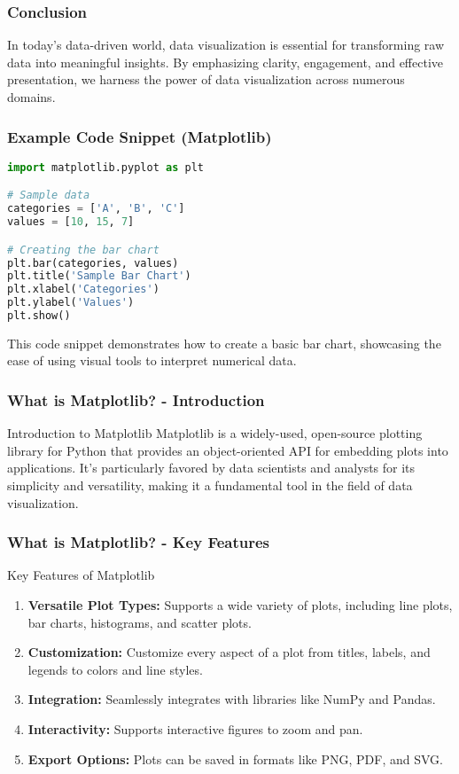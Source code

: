 \documentclass[aspectratio=169]{beamer}
\begin{document}
\begin{frame}[fragile]
    \frametitle{Conclusion}
    In today's data-driven world, data visualization is essential for transforming raw data into meaningful insights. By emphasizing clarity, engagement, and effective presentation, we harness the power of data visualization across numerous domains.
\end{frame}

\begin{frame}[fragile]
    \frametitle{Example Code Snippet (Matplotlib)}
    \begin{lstlisting}[language=Python]
import matplotlib.pyplot as plt

# Sample data
categories = ['A', 'B', 'C']
values = [10, 15, 7]

# Creating the bar chart
plt.bar(categories, values)
plt.title('Sample Bar Chart')
plt.xlabel('Categories')
plt.ylabel('Values')
plt.show()
    \end{lstlisting}
    This code snippet demonstrates how to create a basic bar chart, showcasing the ease of using visual tools to interpret numerical data.
\end{frame}

\begin{frame}[fragile]
    \frametitle{What is Matplotlib? - Introduction}
    \begin{block}{Introduction to Matplotlib}
        Matplotlib is a widely-used, open-source plotting library for Python that provides an object-oriented API for embedding plots into applications. 
        It's particularly favored by data scientists and analysts for its simplicity and versatility, making it a fundamental tool in the field of data visualization.
    \end{block}
\end{frame}

\begin{frame}[fragile]
    \frametitle{What is Matplotlib? - Key Features}
    \begin{block}{Key Features of Matplotlib}
        \begin{enumerate}
            \item \textbf{Versatile Plot Types:} Supports a wide variety of plots, including line plots, bar charts, histograms, and scatter plots.
            \item \textbf{Customization:} Customize every aspect of a plot from titles, labels, and legends to colors and line styles.
            \item \textbf{Integration:} Seamlessly integrates with libraries like NumPy and Pandas.
            \item \textbf{Interactivity:} Supports interactive figures to zoom and pan.
            \item \textbf{Export Options:} Plots can be saved in formats like PNG, PDF, and SVG.
        \end{enumerate}
    \end{block}
\end{frame}
\end{document}
